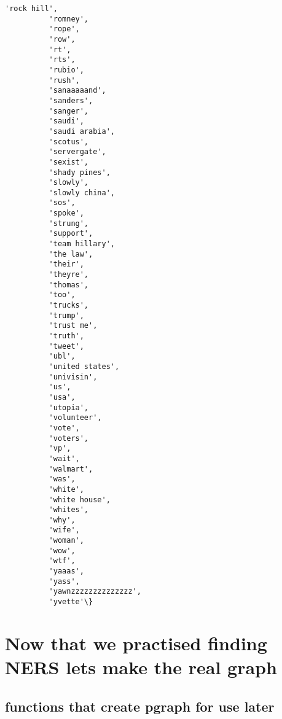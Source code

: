 \documentclass[11pt]{article}
\begin{document}
\begin{Verbatim}[commandchars=\\\{\}]
          'rock hill',
          'romney',
          'rope',
          'row',
          'rt',
          'rts',
          'rubio',
          'rush',
          'sanaaaaand',
          'sanders',
          'sanger',
          'saudi',
          'saudi arabia',
          'scotus',
          'servergate',
          'sexist',
          'shady pines',
          'slowly',
          'slowly china',
          'sos',
          'spoke',
          'strung',
          'support',
          'team hillary',
          'the law',
          'their',
          'theyre',
          'thomas',
          'too',
          'trucks',
          'trump',
          'trust me',
          'truth',
          'tweet',
          'ubl',
          'united states',
          'univisin',
          'us',
          'usa',
          'utopia',
          'volunteer',
          'vote',
          'voters',
          'vp',
          'wait',
          'walmart',
          'was',
          'white',
          'white house',
          'whites',
          'why',
          'wife',
          'woman',
          'wow',
          'wtf',
          'yaaas',
          'yass',
          'yawnzzzzzzzzzzzzzz',
          'yvette'\}
\end{Verbatim}
            
    \section{Now that we practised finding NERS lets make the real
graph}\label{now-that-we-practised-finding-ners-lets-make-the-real-graph}

\subsection{functions that create pgraph for use
later}\label{functions-that-create-pgraph-for-use-later}
\end{document}
